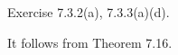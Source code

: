 \begin{Exercise}
	\begin{answer}
		Exercise 7.3.2(a), 7.3.3(a)(d).
	\end{answer}
	\begin{solution}
		It follows from Theorem 7.16.
	\end{solution}
\end{Exercise} 